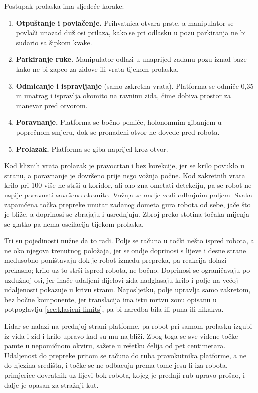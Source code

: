 Postupak prolaska ima sljedeće korake:

\begin{enumerate}
      \item \textbf{Otpuštanje i povlačenje.} Prihvatnica otvara prste, a manipulator se povlači
            unazad duž osi prilaza, kako se pri odlasku u pozu parkiranja ne bi sudario
            sa šipkom kvake.
      \item \textbf{Parkiranje ruke.} Manipulator odlazi u unaprijed zadanu pozu iznad baze kako
            ne bi zapeo za zidove ili vrata tijekom prolaska.
      \item \textbf{Odmicanje i ispravljanje} (samo zakretna vrata). Platforma se odmiče
            0,35 m unatrag i ispravlja okomito na ravninu zida, čime dobiva prostor za manevar
            pred otvorom.
      \item \textbf{Poravnanje.} Platforma se bočno pomiče, holonomnim gibanjem u poprečnom
            smjeru, dok se pronađeni otvor ne dovede pred robota.
      \item \textbf{Prolazak.} Platforma se giba naprijed kroz otvor.
\end{enumerate}

Kod kliznih vrata prolazak je pravocrtan i bez korekcije, jer se krilo povuklo u stranu, a
poravnanje je dovršeno prije nego vožnja počne. Kod zakretnih vrata krilo pri 100\textdegree{}
više ne strši u koridor, ali ono zna ometati detekciju, pa se robot ne uspije poravnati savršeno
okomito. Vožnja se ondje vodi odbojnim poljem. Svaka zapamćena točka prepreke unutar
zadanog dometa gura robota od sebe, jače što je bliže, a doprinosi se zbrajaju i usrednjuju.
Zbroj preko stotina točaka mijenja se glatko pa nema oscilacija tijekom prolaska.

Tri su pojedinosti nužne da to radi. Polje se računa u točki nešto ispred robota, a ne oko
njegova trenutnog položaja, jer se ondje doprinosi s lijeve i desne strane međusobno poništavaju
dok je robot između prepreka, pa reakcija dolazi prekasno; krilo uz to strši ispred robota, ne
bočno. Doprinosi se ograničavaju po uzdužnoj osi, jer inače udaljeni dijelovi zida nadglasaju
krilo i polje na većoj udaljenosti pokazuje u krivu stranu. Naposljetku, polje upravlja samo
zakretom, bez bočne komponente, jer translacija ima istu mrtvu zonu opisanu u potpoglavlju
\ref{sec:klasicni-limits}, pa bi naredba bila ili puna ili nikakva.

Lidar se nalazi na prednjoj strani platforme, pa robot pri samom prolasku izgubi iz vida i zid i
krilo upravo kad su mu najbliži. Zbog toga se sve viđene točke pamte u nepomičnom okviru, sažete
u rešetku ćelija od pet centimetara. Udaljenost do prepreke pritom se računa do ruba pravokutnika
platforme, a ne do njezina središta, i točke se ne odbacuju prema tome jesu li iza robota, primjerice
dovratnik uz lijevi bok robota, kojeg je prednji rub upravo prošao, i dalje je opasan za stražnji kut.

